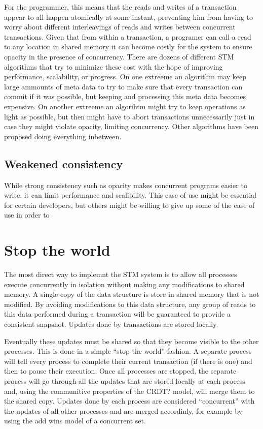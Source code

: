 \documentclass[11pt,letterpaper]{article}
\begin{document}
For the programmer, this means that the reads and writes of a transaction
appear to all happen atomically at some instant, preventing him from having
to worry about different interleavings of reads and writes between concurrent transactions.
Given that from within a transaction, a programer can call a read to any location in shared memory
it can become costly for the system to ensure opacity in the presence of concurrency.
There are dozens of different STM algorithms that try to minimize these cost with the hope
of improving performance, scalability, or progress.
On one extreeme an algorithm may keep large ammounts of meta data to try to make
sure that every transaction can commit if it was possible, but keeping and processing
this meta data becomes expensive.
On another extreeme an algorihtm might try to keep operations as light as possible, but
then might have to abort transactions unnecessarily just in case they might violate
opacity, limiting concurrency.
Other algorithms have been proposed doing everything inbetween.


\subsection{Weakened consistency}
While strong consistency such as opacity makes concurrent programs easier to write,
it can limit performance and scalibility.
This ease of use might be essential for certain developers, but others might be willing
to give up some of the ease of use in order to 


\section{Stop the world}

The most direct way to implemnt the STM system is to allow all processes
execute concurrently in isolation without making any modifications to shared memory.
A single copy of the data structure is store in shared memory that is not modified.
By avoiding modifications to this data structure, any group of reads to this data
performed during a transaction will be guaranteed to provide a consistent snapshot.
Updates done by transactions are stored locally.

Eventually these updates must be shared so that they become visible to the other processes.
This is done in a simple ``stop the world'' fashion.
A separate process will tell every process to complete their current transaction (if there is one) and then to pause
their execution.
Once all processes are stopped, the separate process will go through all the updates that are stored locally at
each process and, using the communitive properties of the CRDT? model, will merge them to the shared copy.
Updates done by each process are considered ``concurrent'' with the updates of all other processes and are merged
accordinly, for example by using the add wins model of a concurrent set.
\end{document}

